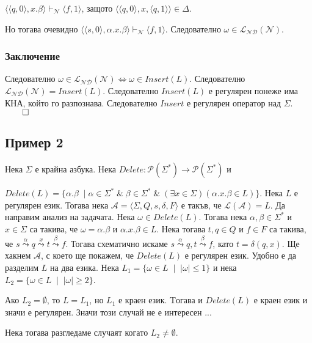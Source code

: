 \documentclass[12pt]{article}
\begin{document}
\(\langle \langle q, 0 \rangle, x.\beta \rangle \vdash_\mathcal{N} \langle f, 1 \rangle \), защото \( \langle \langle q, 0 \rangle, x, \langle q, 1 \rangle \rangle \in \Delta\).

Но тогава очевидно \(\langle \langle s, 0 \rangle, \alpha.x.\beta \rangle \vdash_\mathcal{N} \langle f, 1 \rangle \).
Следователно \(\omega \in \mathcal{L_{ND}}(\mathcal{N})\).

\subsubsection*{Заключение}
Следователно \(\omega \in \mathcal{L_{ND}}(\mathcal{N}) \iff \omega \in Insert(L)\).
Следователно \(\mathcal{L_{ND}}(\mathcal{N}) = Insert(L)\).
Следователно \(Insert(L)\) е регулярен понеже има КНА, който го разпознава.
Следователно \(Insert\) е регулярен оператор над \(\Sigma\). \(\qed\)

\subsection*{Пример 2}
Нека \(\Sigma\) е крайна азбука.
Нека \(Delete : \mathcal{P}(\Sigma^*) \to \mathcal{P}(\Sigma^*)\) и

\(Delete(L) = \{\alpha.\beta \;\mid \alpha \in \Sigma^* \;\&\; \beta \in \Sigma^* \;\&\;  (\exists x \in \Sigma)(\alpha.x.\beta \in L)\}\).
Нека \(L\) е регулярен език. Тогава нека \(\mathcal{A} = \langle \Sigma, Q, s, \delta, F \rangle\) е такъв, че \(\mathcal{L}(\mathcal{A}) = L\). 
Да направим анализ на задачата.
Нека \(\omega \in Delete(L)\). Тогава нека \(\alpha, \beta \in \Sigma^*\) и \(x \in \Sigma\) са такива, че \(\omega = \alpha.\beta\) и \(\alpha.x.\beta \in L\).
Нека тогава \(t, q \in Q\) и \(f \in F\) са такива, че \(s \overset{\alpha}{\leadsto} q \overset{x}{\leadsto} t \overset{\beta}{\leadsto} f\).
Тогава схематично искаме \(s \overset{\alpha}{\leadsto} q, t \overset{\beta}{\leadsto} f\), като \(t = \delta(q, x)\).
Ще хакнем \(\mathcal{A}\), с което ще покажем, че \(Delete(L)\) е регулярен език.
Удобно е да разделим \(L\) на два езика. Нека \(L_1 = \{\omega \in L \;\mid\; |\omega| \leq 1\}\) и нека \(L_2 = \{\omega \in L \;\mid\; |\omega| \geq 2\}\).

Ако \(L_2 = \emptyset\), то \(L = L_1\), но \(L_1\) е краен език. Tогава и \(Delete(L)\) е краен език и значи е регулярен. Значи този случай не е интересен ...

Нека тогава разгледаме случаят когато \(L_2 \neq \emptyset\).
\end{document}
